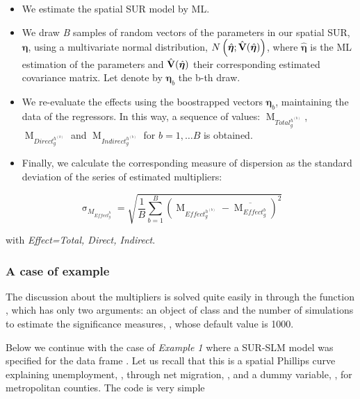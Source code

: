 \documentclass[article]{jss}
\providecommand{\tightlist}{%
  \setlength{\itemsep}{0pt}\setlength{\parskip}{0pt}}
\begin{document}
\begin{itemize}
\tightlist
\item
  We estimate the spatial SUR model by ML.
\item
  We draw \emph{B} samples of random vectors of the parameters in our spatial SUR, \({\boldsymbol \eta}\), using a multivariate normal distribution, \(N \left(\hat{{\boldsymbol \eta}}; \hat{{\bf V}}(\hat{{\boldsymbol \eta}})\right)\), where \(\hat{{\boldsymbol \eta}}\) is the ML estimation of the parameters and \(\hat{{\bf V}}(\hat{{\boldsymbol \eta}})\) their corresponding estimated covariance matrix. Let denote by \({\boldsymbol \eta}_b\) the b-th draw.
\item
  We re-evaluate the effects using the boostrapped vectors \({\boldsymbol \eta}_b\), maintaining the data of the regressors. In this way, a sequence of values: \({\mathop{M}\nolimits_{Total_{g}^{h^{(b)}}}}\), \({\mathop{M}\nolimits_{Direct_{g}^{h^{(b)}}}}\) and \({\mathop{M}\nolimits_{Indirect_{g}^{h^{(b)}}}}\) for \(b=1, \ldots B\) is obtained.
\item
  Finally, we calculate the corresponding measure of dispersion as the standard deviation of the series of estimated multipliers:
\end{itemize}

\begin{equation}
  {\mathop{\sigma}\nolimits_{M_{Effect_{g}^{h}}}} = \sqrt{ \dfrac{1}{B} \sum_{b=1}^B \left( \mathop{M}\nolimits_{Effect_{g}^{h^{(b)}}} - \overline{\mathop{M}\nolimits_{Effect_{g}^{b}}} \right)^{2}}
  \end{equation}

with \emph{Effect=Total, Direct, Indirect}.

\hypertarget{Example-effects}{%
\subsubsection{A case of example}\label{Example-effects}}

The discussion about the multipliers is solved quite easily in  through the function , which has only two arguments: an object of class  and the number of simulations to estimate the significance measures, , whose default value is 1000.

Below we continue with the case of \emph{Example 1} where a SUR-SLM model was specified for the data frame . Let us recall that this is a spatial Phillips curve explaining unemployment, , through net migration, , and a dummy variable, , for metropolitan counties. The code is very simple
\end{document}

